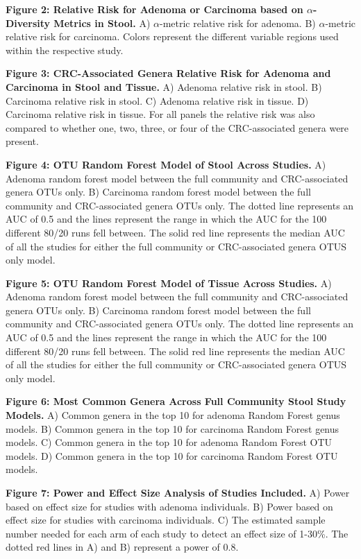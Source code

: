 \documentclass[12pt,]{article}
\begin{document}
\textbf{Figure 2: Relative Risk for Adenoma or Carcinoma based on
\(\alpha\)-Diversity Metrics in Stool.} A) \(\alpha\)-metric relative
risk for adenoma. B) \(\alpha\)-metric relative risk for carcinoma.
Colors represent the different variable regions used within the
respective study.

\textbf{Figure 3: CRC-Associated Genera Relative Risk for Adenoma and
Carcinoma in Stool and Tissue.} A) Adenoma relative risk in stool. B)
Carcinoma relative risk in stool. C) Adenoma relative risk in tissue. D)
Carcinoma relative risk in tissue. For all panels the relative risk was
also compared to whether one, two, three, or four of the CRC-associated
genera were present.

\textbf{Figure 4: OTU Random Forest Model of Stool Across Studies.} A)
Adenoma random forest model between the full community and
CRC-associated genera OTUs only. B) Carcinoma random forest model
between the full community and CRC-associated genera OTUs only. The
dotted line represents an AUC of 0.5 and the lines represent the range
in which the AUC for the 100 different 80/20 runs fell between. The
solid red line represents the median AUC of all the studies for either
the full community or CRC-associated genera OTUS only model.

\textbf{Figure 5: OTU Random Forest Model of Tissue Across Studies.} A)
Adenoma random forest model between the full community and
CRC-associated genera OTUs only. B) Carcinoma random forest model
between the full community and CRC-associated genera OTUs only. The
dotted line represents an AUC of 0.5 and the lines represent the range
in which the AUC for the 100 different 80/20 runs fell between. The
solid red line represents the median AUC of all the studies for either
the full community or CRC-associated genera OTUS only model.

\textbf{Figure 6: Most Common Genera Across Full Community Stool Study
Models.} A) Common genera in the top 10 for adenoma Random Forest genus
models. B) Common genera in the top 10 for carcinoma Random Forest genus
models. C) Common genera in the top 10 for adenoma Random Forest OTU
models. D) Common genera in the top 10 for carcinoma Random Forest OTU
models.

\textbf{Figure 7: Power and Effect Size Analysis of Studies Included.}
A) Power based on effect size for studies with adenoma individuals. B)
Power based on effect size for studies with carcinoma individuals. C)
The estimated sample number needed for each arm of each study to detect
an effect size of 1-30\%. The dotted red lines in A) and B) represent a
power of 0.8.
\end{document}
